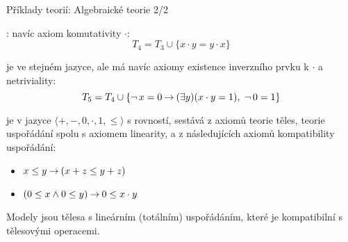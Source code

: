 \documentclass{beamer}
\begin{document}
\begin{frame}{Příklady teorií: Algebraické teorie 2/2}
    
    : navíc axiom \alert{komutativity $\cdot$}:
    {\small
    $$
    T_4 = T_3 \cup \{x \cdot y = y \cdot x\}
    $$
    }
    
     je ve stejném jazyce, ale má navíc axiomy \alert{existence inverzního prvku k $\cdot$} a \alert{netriviality}:
    {\small
    $$
    T_5 = T_4 \cup \{\neg\,x=0 \mathbin{\rightarrow} (\exists y)(x\cdot y = 1),\ \neg\,0=1\}
    $$
    }

     je v jazyce $\langle +, -, 0,\cdot,1,\leq\rangle$ s rovností, sestává z axiomů teorie těles, teorie uspořádání spolu s axiomem linearity, a z následujících axiomů \alert{kompatibility uspořádání}: 

    \begin{itemize}
        \item $x\leq y\mathbin{\rightarrow} (x+z\leq y+z)$
        \item $(0\leq x\land 0\leq y)\mathbin{\rightarrow} 0\leq x\cdot y$
    \end{itemize}

    Modely jsou tělesa s \alert{lineárním (totálním)} uspořádáním, které je kompatibilní s tělesovými operacemi.

\end{frame}
\end{document}
